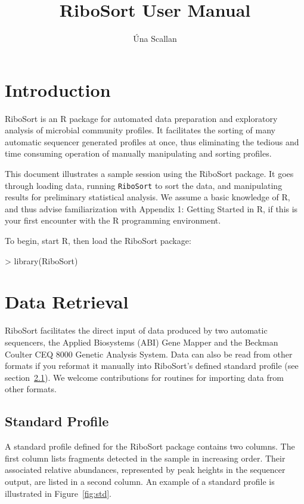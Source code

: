 \documentclass[a4paper]{article}
\title{RiboSort User Manual}
\author{\'{U}na Scallan}
\begin{document}
\maketitle

\section {Introduction}

RiboSort is an R package for automated data preparation and exploratory analysis of microbial community profiles. It facilitates the sorting of many automatic sequencer generated profiles at once, thus eliminating the tedious and time consuming operation of manually manipulating and sorting profiles. 

This document illustrates a sample session using the RiboSort package. It goes through loading data, running \texttt{RiboSort} to sort the data, and manipulating results for preliminary statistical analysis. We assume a basic  knowledge of R, and thus advise familiarization with Appendix 1: Getting Started in R, if this is your first encounter with the R programming environment.

To begin, start R, then load the RiboSort package:

\begin{Schunk}
\begin{Sinput}
> library(RiboSort)
\end{Sinput}
\end{Schunk}
\section{Data Retrieval}

RiboSort facilitates the direct input of data produced by two automatic sequencers, the Applied Biosystems (ABI) Gene Mapper and the Beckman Coulter CEQ 8000 Genetic Analysis System. Data can also be read from other formats if you reformat it manually into RiboSort's defined standard profile (see section~\ref{sec:std}). We welcome contributions for routines for importing data from other formats.

\subsection{\textbf{Standard Profile}}
\label{sec:std}
A standard profile defined for the RiboSort package contains two columns. The first column lists fragments detected in the sample in increasing order. Their associated relative abundances, represented by peak heights in the sequencer output, are listed in a second column. An example of a standard profile is illustrated in Figure~\ref{fig:std}.
\end{document}
